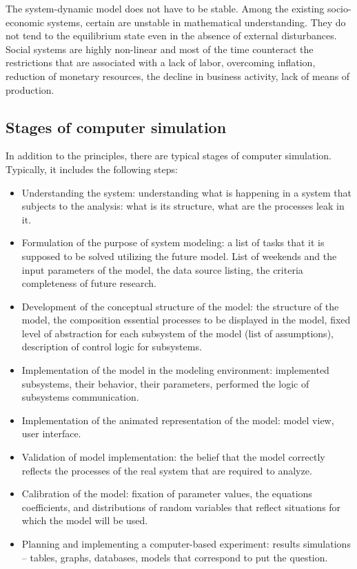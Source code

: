 \documentclass[12pt]{report}
\theoremstyle{definition}
\providecommand{\tightlist}{%
	\setlength{\itemsep}{0pt}\setlength{\parskip}{0pt}}
\begin{document}
The system-dynamic model does not have to be stable.
Among the existing socio-economic systems, certain are unstable in mathematical understanding.
They do not tend to the equilibrium state even in the absence of external disturbances.
Social systems are highly non-linear and most of the time counteract the restrictions that are associated with a lack of labor, overcoming inflation, reduction of monetary resources, the decline in business activity, lack of means of production.

\subsection{Stages of computer simulation}
In addition to the principles, there are typical stages of computer simulation. 
Typically, it includes the following steps:

\begin{itemize}
	\tightlist
	\item Understanding the system: understanding what is happening in a system that subjects to the analysis: what is its structure, what are the processes leak in it.
	\item Formulation of the purpose of system modeling: a list of tasks that it is supposed to be solved utilizing the future model. List of weekends and  the input parameters of the model, the data source listing, the criteria completeness of future research.
	\item Development of the conceptual structure of the model:  the structure of the model, the composition essential processes to be displayed in the model,  fixed level of abstraction for each subsystem of the model  (list of assumptions), description of control logic for subsystems.
	\item Implementation of the model in the modeling environment: implemented subsystems, their behavior, their parameters, performed the logic of subsystems communication.
	\item Implementation of the animated representation of the model: model view, user interface.
	\item Validation of model implementation: the belief that the model correctly reflects the processes of the real system that are required to analyze.
	\item Calibration of the model: fixation of parameter values, the equations coefficients, and distributions of random variables that reflect situations for which the model will be used.
	\item Planning and implementing a computer-based experiment: results simulations -- tables, graphs, databases, models that correspond to put the question.
\end{itemize}
\end{document}
